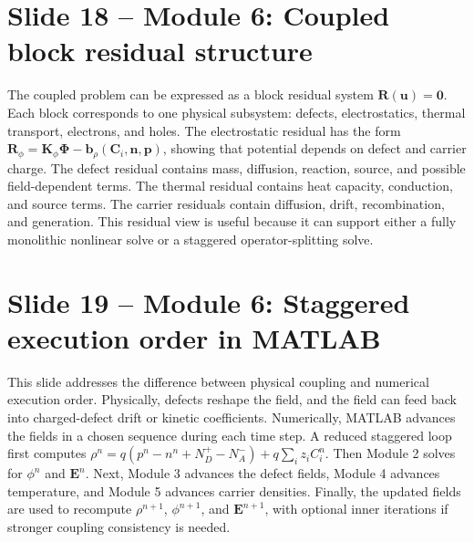 \documentclass[11pt]{article}
\newcommand{\E}{\bm{E}}
\newcommand{\mat}[1]{\mathbf{#1}}
\newcommand{\vect}[1]{\bm{#1}}
\begin{document}
\section*{Slide 18 -- Module 6: Coupled block residual structure}
\begin{scriptbox}
The coupled problem can be expressed as a block residual system \(\vect{R}(\vect{u})=\vect{0}\). Each block corresponds to one physical subsystem: defects, electrostatics, thermal transport, electrons, and holes. The electrostatic residual has the form \(\vect{R}_\phi=\mat{K}_\phi\vect{\Phi}-\vect{b}_\rho(\vect{C}_i,\vect{n},\vect{p})\), showing that potential depends on defect and carrier charge. The defect residual contains mass, diffusion, reaction, source, and possible field-dependent terms. The thermal residual contains heat capacity, conduction, and source terms. The carrier residuals contain diffusion, drift, recombination, and generation. This residual view is useful because it can support either a fully monolithic nonlinear solve or a staggered operator-splitting solve.
\end{scriptbox}

\section*{Slide 19 -- Module 6: Staggered execution order in MATLAB}
\begin{scriptbox}
This slide addresses the difference between physical coupling and numerical execution order. Physically, defects reshape the field, and the field can feed back into charged-defect drift or kinetic coefficients. Numerically, MATLAB advances the fields in a chosen sequence during each time step. A reduced staggered loop first computes \(\rho^n=q(p^n-n^n+N_D^+-N_A^-)+q\sum_iz_iC_i^n\). Then Module 2 solves for \(\phi^n\) and \(\E^n\). Next, Module 3 advances the defect fields, Module 4 advances temperature, and Module 5 advances carrier densities. Finally, the updated fields are used to recompute \(\rho^{n+1}\), \(\phi^{n+1}\), and \(\E^{n+1}\), with optional inner iterations if stronger coupling consistency is needed.
\end{scriptbox}
\end{document}
